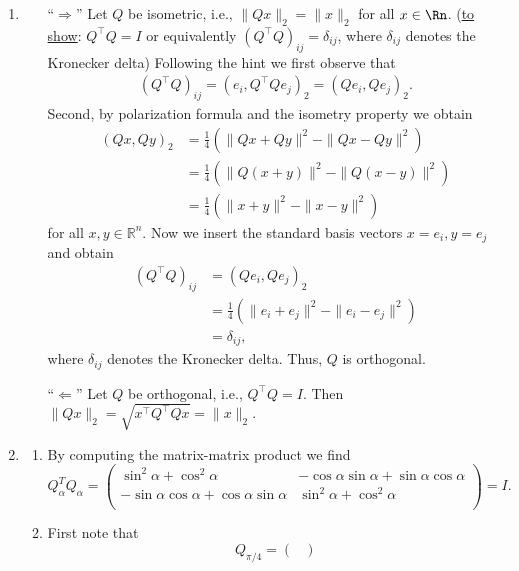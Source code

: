 {\color{solution}

\begin{enumerate}
	\item
	\begin{itemize}
		\item[``$\Rightarrow$'']Let $Q$ be isometric, i.e., $\|Q x\|_2=\|x\|_2$ for all $x \in \Rn$. (\underline{to show}: $Q^\top Q = I$ or equivalently $(Q^\top Q)_{ij} = \delta_{ij}$, where $\delta_{ij}$ denotes the Kronecker delta) Following the hint we first observe that 
				\begin{align*}
		(Q^\top Q)_{ij} 
		= (e_i,Q^\top Q e_j)_2= (Qe_i, Q e_j)_2.
		\end{align*}
		 Second, by polarization formula and the isometry property we obtain
		\begin{align*}
		 (Q x,Q y)_2
		 &= \frac{1}{4} \left(\|Q x+Q y\|^2-\|Q x-Q y\|^2\right)\\
		 &=\frac{1}{4} \left(\|Q (x+y)\|^2-\|Q (x-y)\|^2\right)\\
		 &=\frac{1}{4} \left(\|x+y\|^2-\| x-y\|^2\right)
		\end{align*}
		for all $x,y\in\mathbb{R}^n$. Now we insert the standard basis vectors $x=e_i, y=e_j$ and obtain
		\begin{align*}
		  (Q^\top Q)_{ij} 
		  &= (Q e_i,Q e_j)_2\\
		  &=\frac{1}{4} \left(\|e_i+e_j\|^2-\| e_i-e_j\|^2\right)\\
		  &=\delta_{ij},
		 \end{align*}
		where $\delta_{ij}$ denotes the Kronecker delta. Thus, $Q$ is orthogonal.
		\item[``$\Leftarrow$''] Let $Q$ be orthogonal, i.e., $Q ^\top Q = I$. Then $\|Q x\|_2=\sqrt{x^\top Q ^\top Q  x}=\|x\|_2$. 
	\end{itemize} 	
	\item  
	\begin{enumerate}
		\item By computing the matrix-matrix product we find	$$Q_\alpha^TQ_\alpha = 
		\begin{pmatrix}
		\sin^2\alpha + \cos^2\alpha  & - \cos \alpha\sin \alpha + \sin \alpha \cos \alpha \\
		- \sin \alpha\cos \alpha + \cos \alpha\sin \alpha  &\sin^2\alpha + \cos^2\alpha \\
		\end{pmatrix} = I .
		$$
		\item First note that $$Q_{\pi/4} = \begin{pmatrix}

\end{pmatrix}$$
\end{enumerate}
\end{enumerate}}

